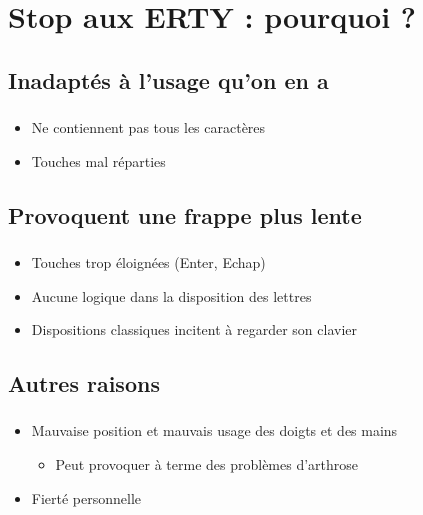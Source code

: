 \documentclass[c,12pt]{beamer}
\begin{document}
\section{Stop aux ERTY : pourquoi ?}
\subsection{Inadaptés à l'usage qu'on en a}

\begin{frame}
	\frametitle{\subsecname}
	\begin{itemize}
		\item<2->{Ne contiennent pas tous les caractères}
		\item<3->{Touches mal réparties}
	\end{itemize}
\end{frame}

\subsection{Provoquent une frappe plus lente}

\begin{frame}
	\frametitle{\subsecname}
	\begin{itemize}
		\item<1->{Touches trop éloignées (Enter, Echap)}
		\item<2->{Aucune logique dans la disposition des lettres}
		\item<3->{Dispositions classiques incitent à regarder son clavier}
	\end{itemize}
\end{frame}

\subsection{Autres raisons}

\begin{frame}
	\frametitle{\subsecname}
	\begin{itemize}
		\item<1->{Mauvaise position et mauvais usage des doigts et des mains}
			\begin{itemize}
				\item{Peut provoquer à terme des problèmes d'arthrose}
			\end{itemize}
		\item<2->{Fierté personnelle}
	\end{itemize}
\end{frame}
\end{document}
